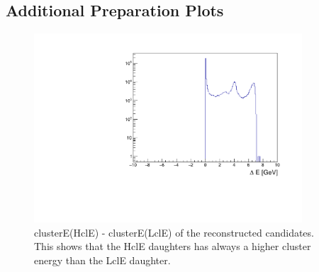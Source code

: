 \documentclass[a4paper,11pt,twosided,final,german,openbib,pdftex,listof=totoc,bibliography=totoc]{scrbook}
\begin{document}
\begin{appendix}
	

	
	
\chapter{Additional Preparation Plots}


\begin{figure}[h!]
	\centering
	\includegraphics[width=10cm]{AnhangPlots/clEDiff.pdf}
	\caption[clusterE(HclE) - clusterE(LclE)]{clusterE(HclE) - clusterE(LclE) of the reconstructed candidates. This shows that the HclE daughters has always a higher cluster energy than the LclE daughter.}
	\label{fig:clEDiff}
\end{figure}














\end{appendix}
\end{document}
